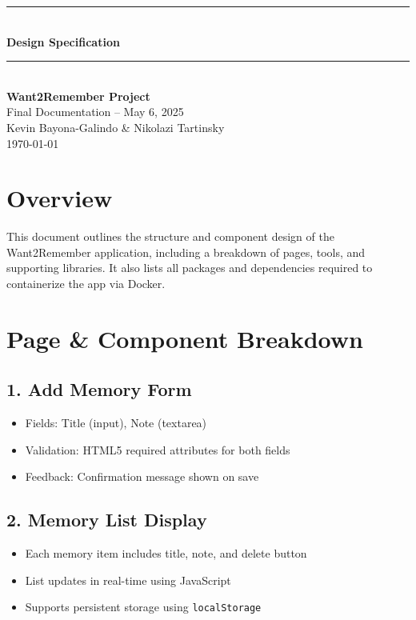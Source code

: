 \documentclass[12pt]{article}
\begin{document}
\begin{titlepage}
    \newcommand{\HRule}{\rule{\linewidth}{0.5mm}} 
    \vspace*{\fill}
    \begin{center}
        \HRule \\[0.5cm]
        {\Huge \bfseries Design Specification \\[0.4cm]}
        \HRule \\[1.5cm]
        {\LARGE \textbf{Want2Remember Project}}\\[0.5cm]
        {\Large Final Documentation – May 6, 2025}\\[2cm]
        {\Large Kevin Bayona-Galindo \& Nikolazi Tartinsky}\\[0.5cm]
        {\large \today}
    \end{center}
    \vspace*{\fill}
\end{titlepage}

\tableofcontents
\newpage

\section{Overview}
This document outlines the structure and component design of the Want2Remember application, including a breakdown of pages, tools, and supporting libraries. It also lists all packages and dependencies required to containerize the app via Docker.

\section{Page \& Component Breakdown}

\subsection*{1. Add Memory Form}
\begin{itemize}
  \item Fields: Title (input), Note (textarea)
  \item Validation: HTML5 required attributes for both fields
  \item Feedback: Confirmation message shown on save
\end{itemize}

\subsection*{2. Memory List Display}
\begin{itemize}
  \item Each memory item includes title, note, and delete button
  \item List updates in real-time using JavaScript
  \item Supports persistent storage using \texttt{localStorage}
\end{itemize}
\end{document}
